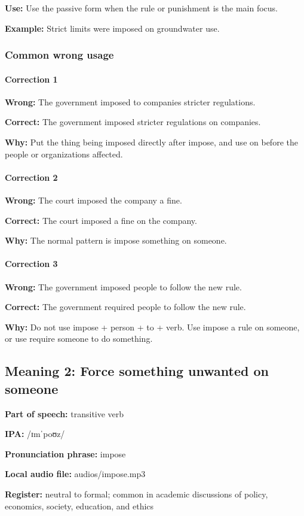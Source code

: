 \documentclass[11pt]{article}
\begin{document}
\textbf{Use:} Use the passive form when the rule or punishment is the main focus.

\textbf{Example:} Strict limits were imposed on groundwater use.

\subsubsection{Common wrong usage}
\paragraph{Correction 1}
\textbf{Wrong:} The government imposed to companies stricter regulations.

\textbf{Correct:} The government imposed stricter regulations on companies.

\textbf{Why:} Put the thing being imposed directly after impose, and use on before the people or organizations affected.

\paragraph{Correction 2}
\textbf{Wrong:} The court imposed the company a fine.

\textbf{Correct:} The court imposed a fine on the company.

\textbf{Why:} The normal pattern is impose something on someone.

\paragraph{Correction 3}
\textbf{Wrong:} The government imposed people to follow the new rule.

\textbf{Correct:} The government required people to follow the new rule.

\textbf{Why:} Do not use impose + person + to + verb. Use impose a rule on someone, or use require someone to do something.

\subsection{Meaning 2: Force something unwanted on someone}
\textbf{Part of speech:} transitive verb

\textbf{IPA:} /ɪmˈpoʊz/

\textbf{Pronunciation phrase:} impose

\textbf{Local audio file:} audios/impose.mp3

\textbf{Register:} neutral to formal; common in academic discussions of policy, economics, society, education, and ethics
\end{document}
